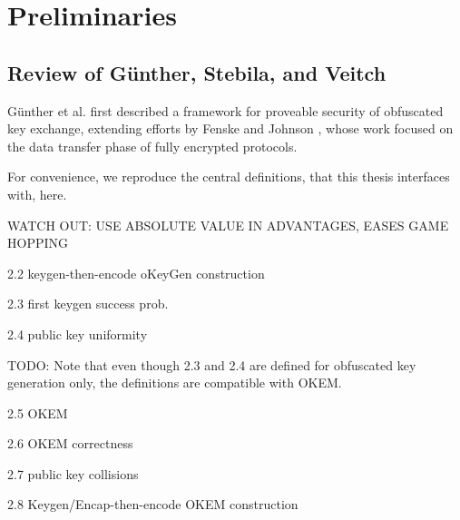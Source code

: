 \chapter{Preliminaries}\label{ch:preliminaries}

\section{\texorpdfstring{Review of Günther, Stebila, and Veitch \cite{CCS:GunSteVei24}}{Review of Günther, Stebila, and Veitch}} \label{sec:review-gsv24}

Günther et al. first described a framework for proveable security of obfuscated key exchange, extending efforts by Fenske and Johnson \cite{CCS:FenJoh24}, whose work focused on the data transfer phase of fully encrypted protocols.

For convenience, we reproduce the central definitions, that this thesis interfaces with, here.

WATCH OUT: USE ABSOLUTE VALUE IN ADVANTAGES, EASES GAME HOPPING

\begin{definition}\label{def:keygen-then-encode}
    2.2 keygen-then-encode oKeyGen construction
\end{definition}

\begin{definition}\label{def:first-keygen-success}
    2.3 first keygen success prob.
\end{definition}

\begin{definition}\label{def:pk-uniformity}
    2.4 public key uniformity
\end{definition}

TODO: Note that even though 2.3 and 2.4 are defined for obfuscated key generation only, the definitions are compatible with OKEM.

\begin{definition}\label{def:okem}
    2.5 OKEM
\end{definition}

\begin{definition}\label{def:okem-correctness}
    2.6 OKEM correctness
\end{definition}

\begin{definition}\label{def:pk-collisions}
    2.7 public key collisions
\end{definition}

\begin{definition}\label{def:keygen-encap-then-encode}
    2.8 Keygen/Encap-then-encode OKEM construction
\end{definition}

